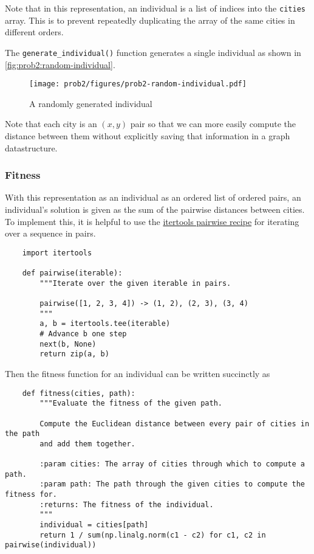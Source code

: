 \documentclass{article}
\begin{document}
Note that in this representation, an individual is a list of indices into the
\texttt{cities} array. This is to prevent repeatedly duplicating the array of the same
cities in different orders.

The \texttt{generate_individual()} function generates a single individual as shown in
\autoref{fig:prob2:random-individual}.

\begin{figure}[h]
    \centering
    \texttt{[image: prob2/figures/prob2-random-individual.pdf]}
    \caption{A randomly generated individual}\label{fig:prob2:random-individual}
\end{figure}

Note that each city is an $(x, y)$ pair so that we can more easily compute the distance between
them without explicitly saving that information in a graph datastructure.

\subsubsection{Fitness}
With this representation as an individual as an ordered list of ordered pairs, an individual's
solution is given as the sum of the pairwise distances between cities. To implement this, it is
helpful to use the
\href{https://docs.python.org/3/library/itertools.html#itertools-recipes}{itertools pairwise
    recipe} for iterating over a sequence in pairs.
\begin{verbatim}
    import itertools

    def pairwise(iterable):
        """Iterate over the given iterable in pairs.

        pairwise([1, 2, 3, 4]) -> (1, 2), (2, 3), (3, 4)
        """
        a, b = itertools.tee(iterable)
        # Advance b one step
        next(b, None)
        return zip(a, b)
\end{verbatim}
Then the fitness function for an individual can be written succinctly as
\begin{verbatim}
    def fitness(cities, path):
        """Evaluate the fitness of the given path.

        Compute the Euclidean distance between every pair of cities in the path
        and add them together.

        :param cities: The array of cities through which to compute a path.
        :param path: The path through the given cities to compute the fitness for.
        :returns: The fitness of the individual.
        """
        individual = cities[path]
        return 1 / sum(np.linalg.norm(c1 - c2) for c1, c2 in pairwise(individual))
\end{verbatim}
\end{document}
